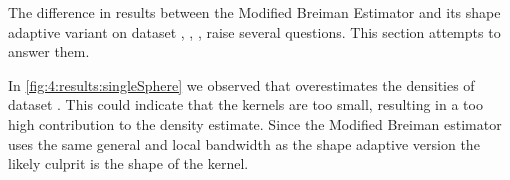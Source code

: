 
The difference in results between the Modified Breiman Estimator and its shape adaptive variant on dataset \ferdosiOne, \baakmanOne, \baakmanFour, \baakmanFive raise several questions. This section attempts to answer them.

In \cref{fig:4:results:singleSphere} we observed that \sambe overestimates the densities of dataset \ferdosiOne. This could indicate that the kernels are too small, resulting in a too high contribution to the density estimate. Since the Modified Breiman estimator uses the same general and local bandwidth as the shape adaptive version the likely culprit is the shape of the kernel. 

